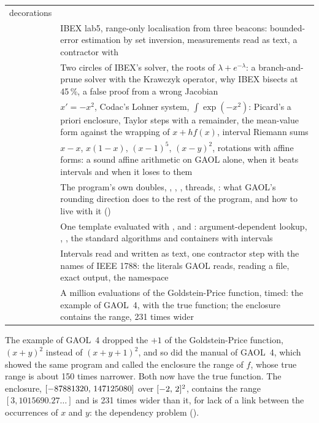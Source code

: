 \documentclass[12pt,a4paper,twoside,openright]{book}
\begin{document}
\begin{longtable}{L{4.3cm}L{9.5cm}}
    decorations\\
   & IBEX lab5, range-only localisation from
    three beacons: bounded-error estimation by set inversion, measurements
    read as text, a contractor with \\
   & Two circles of IBEX's solver, the roots of
    $\lambda+e^{-\lambda}$: a branch-and-prune solver with the Krawczyk
    operator, why IBEX bisects at 45\,\%, a false proof from a wrong
    Jacobian\\
   & $x'=-x^2$, Codac's Lohner system,
    $\int\exp(-x^2)$: Picard's a priori enclosure, Taylor steps with a
    remainder, the mean-value form against the wrapping of $x+hf(x)$,
    interval Riemann sums\\
   & $x-x$, $x(1-x)$, $(x-1)^5$, $(x-y)^2$,
    rotations with affine forms: a sound affine arithmetic on GAOL alone,
    when it beats intervals and when it loses to them\\
   & The program's own doubles,
    , , , threads, :
    what GAOL's rounding direction does to the rest of the program, and how
    to live with it ()\\
   & One template evaluated with
    ,  and : argument-dependent
    lookup, , , the standard algorithms
    and containers with intervals\\
   & Intervals read and written as text, one
    contractor step with the names of IEEE 1788: the literals GAOL reads,
    reading a file, exact output, the namespace \\
   & A million evaluations of the Goldstein-Price
    function, timed: the example of GAOL~4, with the true function; the
    enclosure contains the range, 231 times wider\\
\end{longtable}
\endgroup

\begin{Rem}
The example of GAOL~4 dropped the $+1$ of the Goldstein-Price function,
$(x+y)^2$ instead of $(x+y+1)^2$, and so did the manual of GAOL~4, which
showed the same program and called the enclosure the range of $f$, whose
true range is about 150 times narrower. Both now have the true
function.\newinvfive{} The enclosure, $[-87881320,\,147125080]$ over
$[-2,\,2]^2$, contains the range $[3, 1015690.27\ldots]$ and is 231 times
wider than it, for lack of a link between the occurrences of $x$ and $y$: the
dependency problem ().
\end{Rem}
\end{document}
